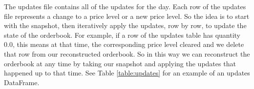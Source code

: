 \begin{table}[H]
    \centering
    \caption{Example snapshot data for BTCUSDT.}
    \label{table:snap}
\end{table}

The updates file contains all of the updates for the day.
Each row of the updates file represents a change to a price level or a new price level.
So the idea is to start with the snapshot, then iteratively apply the updates, row by row,
to update the state of the orderbook. For example, if a row of the updates table has quantity 0.0,
this means at that time, the corresponding price level cleared and we delete that row
from our reconstructed orderbook. So in this way we can reconstruct the orderbook at any time
by taking our snapshot and applying the updates that happened up to that time.
See Table \ref{table:updates} for an example of an updates DataFrame.



